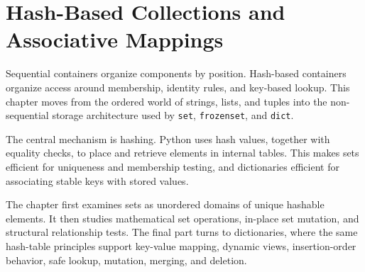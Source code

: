\chapter{Hash-Based Collections and Associative Mappings}

Sequential containers organize components by position. Hash-based containers organize access around membership, identity rules, and key-based lookup. This chapter moves from the ordered world of strings, lists, and tuples into the non-sequential storage architecture used by \texttt{set}, \texttt{frozenset}, and \texttt{dict}.

The central mechanism is hashing. Python uses hash values, together with equality checks, to place and retrieve elements in internal tables. This makes sets efficient for uniqueness and membership testing, and dictionaries efficient for associating stable keys with stored values.

The chapter first examines sets as unordered domains of unique hashable elements. It then studies mathematical set operations, in-place set mutation, and structural relationship tests. The final part turns to dictionaries, where the same hash-table principles support key-value mapping, dynamic views, insertion-order behavior, safe lookup, mutation, merging, and deletion.
